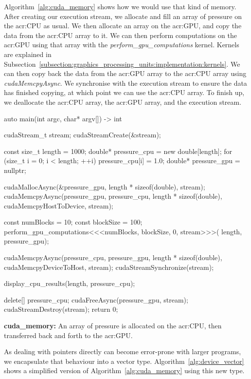 Algorithm~\ref{alg:cuda_memory} shows how we would use that kind of memory. After creating our
execution stream, we allocate and fill an array of pressure on the \acrshort{acr:CPU} as usual. We
then allocate an array on the \acrshort{acr:GPU}, and copy the data from the \acrshort{acr:CPU}
array to it. We can then perform computations on the \acrshort{acr:GPU} using that array with the
\textit{perform\_gpu\_computations} kernel. Kernels are explained in
Subsection~\ref{subsection:graphics_processing_units:implementation:kernels}. We can then copy back
the data from the \acrshort{acr:GPU} array to the \acrshort{acr:CPU} array using
\textit{cudaMemcpyAsync}. We synchronise with the execution stream to ensure the data has finished
copying, at which point we can use the \acrshort{acr:CPU} array. To finish up, we deallocate the
\acrshort{acr:CPU} array, the \acrshort{acr:GPU} array, and the execution stream.

\begin{algorithm}[H]
    \begin{cuda}
		auto main(int argc, char* argv[]) -> int {
			cudaStream_t stream;
			cudaStreamCreate(&stream); 

			const size_t length = 1000;
			double* pressure_cpu = new double[length];
			for (size_t i = 0; i < length; ++i){
				pressure_cpu[i] = 1.0;
			}
			double* pressure_gpu = nullptr;

			cudaMallocAsync(&pressure_gpu, length * sizeof(double), stream);
			cudaMemcpyAsync(pressure_gpu, pressure_cpu, length * sizeof(double), 
                cudaMemcpyHostToDevice, stream);

			const numBlocks = 10;
			const blockSize = 100;
			perform_gpu_computations<<<numBlocks, blockSize, 0, stream>>>(
				length, pressure_gpu);
			
			cudaMemcpyAsync(pressure_cpu, pressure_gpu, length * sizeof(double), 
                cudaMemcpyDeviceToHost, stream);
			cudaStreamSynchronize(stream);

			display_cpu_results(length, pressure_cpu);

			delete[] pressure_cpu;
			cudaFreeAsync(pressure_gpu, stream);
			cudaStreamDestroy(stream);
			return 0;
		}\end{cuda}
\caption{\textbf{cuda\_memory:} An array of pressure is allocated on the \acrshort{acr:CPU}, then transferred back and forth to the \acrshort{acr:GPU}.}\label{alg:cuda_memory}
\end{algorithm}

As dealing with pointers directly can become error-prone with larger programs, we encapsulate that
behaviour into a vector type. Algorithm~\ref{alg:device_vector} shows a simplified version of
Algorithm~\ref{alg:cuda_memory} using this new type.

